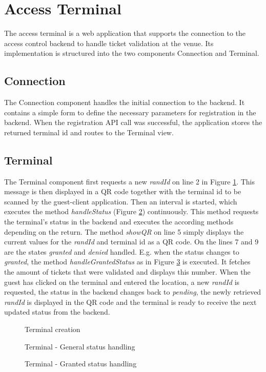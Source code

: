 \section{Access Terminal}\label{imp:terminal}
The access terminal is a web application that supports the connection to the access control backend to handle ticket validation at the venue. Its implementation is structured into the two components Connection and Terminal.

\subsection{Connection}
The Connection component handles the initial connection to the backend. It contains a simple form to define the necessary parameters for registration in the backend. When the registration API call was successful, the application stores the returned terminal id and routes to the Terminal view.

\subsection{Terminal}
The Terminal component first requests a new \textit{randId} on line 2 in Figure \ref{code:terminal-start}. This message is then displayed in a QR code together with the terminal id to be scanned by the guest-client application. Then an interval is started, which executes the method \textit{handleStatus} (Figure \ref{code:terminal-status-handling}) continuously. This method requests the terminal's status in the backend and executes the according methods depending on the return. The method \textit{showQR} on line 5 simply displays the current values for the \textit{randId} and terminal id as a QR code. On the lines 7 and 9 are the states \textit{granted} and \textit{denied} handled. E.g. when the status changes to \textit{granted}, the method \textit{handleGrantedStatus} as in Figure \ref{code:terminal-handle-granted} is executed. It fetches the amount of tickets that were validated and displays this number. When the guest has clicked on the terminal and entered the location, a new \textit{randId} is requested, the status in the backend changes back to \textit{pending}, the newly retrieved \textit{randId} is displayed in the QR code and the terminal is ready to receive the next updated status from the backend.

\begin{figure}[H]
    
    \caption{Terminal creation}
    \label{code:terminal-start}
\end{figure}

\begin{figure}[H]
    
    \caption{Terminal - General status handling}
    \label{code:terminal-status-handling}
\end{figure}

\begin{figure}[H]
    
    \caption{Terminal - Granted status handling}
    \label{code:terminal-handle-granted}
\end{figure}
